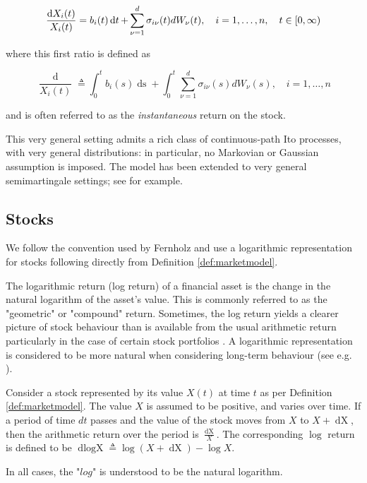 \documentclass[british]{amsart} \usepackage{lmodern}
\numberwithin{equation}{section} \numberwithin{figure}{section}
\theoremstyle{plain} \newtheorem{thm}{\protect\theoremname}[section]
\theoremstyle{definition} \newtheorem{defn}[thm]{\protect\definitionname}
\theoremstyle{plain} \newtheorem{assumption}[thm]{\protect\assumptionname}
\theoremstyle{plain} \newtheorem{lem}[thm]{\protect\lemmaname}
\theoremstyle{plain} \newtheorem{prop}[thm]{\protect\propositionname}
\theoremstyle{remark} \newtheorem{rem}[thm]{\protect\remarkname}
\theoremstyle{plain} \newtheorem{cor}[thm]{\protect\corollaryname}
\renewcommand{\d}[1]{\mathop{\mathrm{d}{#1}}}
\newcommand{\defeq}{\mathop{\triangleq}} \newcommand{\almostsurely}{\text{a.s.}}
\newcommand{\rangei}{i=1,\dots,n} \newcommand{\measure}{\mathbb{P}}
\begin{document}
\begin{equation}
  \label{eq:stockpriceprocessdiff}
    \frac{\d{X_{i}(t)}}{X_{i}(t)} = b_{i}(t)\d{t} + \sum_{\nu=1}^{d} \sigma_{i\nu}(t) dW_{\nu}(t),
  \quad \rangei,
  \quad \ranget
\end{equation}

where this first ratio is defined as

\begin{equation*}
  \frac{\d{X_{i}(t)}}{X_{i}(t)} \defeq 
  \int_{0}^{t} b_{i}(s)\d{s} + 
  \int_{0}^{t} \sum_{\nu=1}^{d} \sigma_{i\nu}(s) dW_{\nu}(s),
  \quad \rangei
\end{equation*}

and is often referred to as the \textit{instantaneous} return on the stock.

This very general setting admits a rich class of continuous-path Ito processes,
with very general distributions: in particular, no Markovian or Gaussian
assumption is imposed. The model has been extended to very general
semimartingale settings; see \cite{kardaras2003} for example.

\subsection{Stocks}

We follow the convention used by Fernholz and use a logarithmic representation
for stocks following directly from Definition \ref{def:marketmodel}.

The logarithmic return (log return) of a financial asset is the change in the
natural logarithm of the asset's value. This is commonly referred to as the
"geometric" or "compound" return. Sometimes, the log return yields a clearer
picture of stock behaviour than is available from the usual arithmetic return
particularly in the case of certain stock portfolios
\cite{fernholz2007statistics}. A logarithmic representation is considered to be
more natural when considering long-term behaviour (see e.g.
\cite{fernholz1982}).

Consider a stock represented by its value $X(t)$ at time $t$ as per Definition
\ref{def:marketmodel}. The value $X$ is assumed to be positive, and varies over
time. If a period of time $dt$ passes and the value of the stock moves from $X$
to $X + \d{X}$, then the arithmetic return over the period is $\frac{\d{X}}{X}$.
The corresponding $\log$ return is defined to be $\d{\log{X}} \defeq \log{(X +
\d{X})} - \log{X}$.

In all cases, the "$log$" is understood to be the natural logarithm.
\end{document}

